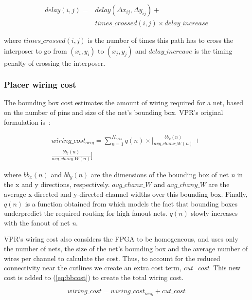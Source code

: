 \documentclass{sig-alternate-2013}
\begin{document}
\begin{equation} \label{eq:timing_cost}
\begin{split}
delay(i,j) =& delay(\Delta x_{ij}, \Delta y_{ij}) + \\
&times\_crossed(i,j) \times delay\_increase
\end{split}
\end{equation}

where $times\_crossed(i,j)$ is the number of times this path has to cross the interposer to go from $(x_i,y_i)$ to $(x_j,y_j)$ and $delay\_increase$ is the timing penalty of crossing the interposer.

\subsubsection{Placer wiring cost}
The bounding box cost estimates the amount of wiring required for a net, based on the number of pins and size of the net's bounding box. VPR's original formulation is~\cite{betz1997vpr}:

\begin{equation} \label{eq:bbcost}
\begin{split}
wiring\_cost_{orig} = \sum_{n=1}^{N_{nets}} q(n) \times [\frac{bb_x(n)}{avg\_chanx\_W(n)} + \\
\frac{bb_y(n)}{avg\_chany\_W(n)}]
\end{split}
\end{equation}

where $bb_x(n)$ and $bb_y(n)$ are the dimensions of the bounding box of net \textit{n} in the x and y directions, respectively. $avg\_chanx\_W$ and $avg\_chany\_W$ are the average x-directed and y-directed channel widths over this bounding box. Finally, $q(n)$ is a function obtained from \cite{icann} which models the fact that bounding boxes underpredict the required routing for high fanout nets. $q(n)$ slowly increases with the fanout of net \textit{n}.

VPR's wiring cost also considers the FPGA to be homogeneous, and uses only the number of nets, the size of the net's bounding box and the average number of wires per channel to calculate the cost. Thus, to account for the reduced connectivity near the cutlines we create an extra cost term, \textit{cut\_cost}. This new cost is added to (\ref{eq:bbcost}) to create the total wiring cost.

\begin{equation} \label{eq:total_wiring}
wiring\_cost = wiring\_cost_{orig} + cut\_cost
\end{equation}
\end{document}
